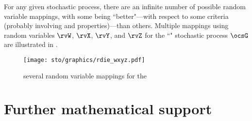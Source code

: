 For any given stochastic process, there are an infinite number of possible random variable mappings,
with some being ``better"---with respect to some criteria (probably involving 
and  properties)---than others. 
Multiple mappings using random variables $\rvW$, $\rvX$, $\rvY$, and $\rvZ$
for the ``" stochastic process $\ocsG$ are illustrated in .
\begin{figure}[h]
  \centering%
  \gsize%
  {\texttt{[image: sto/graphics/rdie\_wxyz.pdf]}}%
  \caption{several random variable mappings for the  \label{fig:intro_realdieXRYZ}}
\end{figure}


\section{Further mathematical support}


